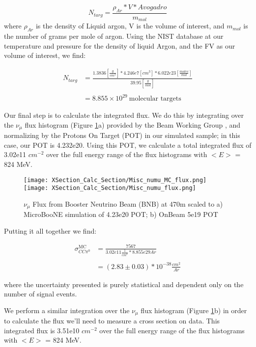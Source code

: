 \begin{equation} \label{eq:1}
  N_{targ} = \frac{\rho_{Ar} * V * Avogadro}{m_{mol}} 
\end{equation}
\noindent where $\rho_{Ar}$ is the density of Liquid argon, V is the volume of interest, and $m_{mol}$ is the number of grams per mole of argon.  Using the NIST database at our temperature and pressure for the density of liquid Argon, and the FV as our volume of interest, we find: 

\begin{align}
N_{targ} &= \frac{1.3836 [\frac{g}{cm^3}] * 4.246e7 [cm^3] * 6.022e23 [\frac{molec}{mol}]}{39.95 [\frac{g}{mol}]} \\\\
&= 8.855\times10^{29}~\text{molecular targets}
\end{align}

\par Our final step is to calculate the integrated flux.  We do this by integrating over the $\nu_\mu$ flux histogram (Figure \ref{fig:flux}a) provided by the Beam Working Group \cite{bib:flux}, and normalizing by the Protons On Target (POT) in our simulated sample; in this case, our POT is 4.232e20.  Using this POT, we calculate a total integrated flux of 3.02e11 $cm^{-2}$ over the full energy range of the flux histograms with $<E>$ = 824 MeV. 
\begin{figure}[H]
\centering
\texttt{[image: XSection\_Calc\_Section/Misc\_numu\_MC\_flux.png]}
\texttt{[image: XSection\_Calc\_Section/Misc\_numu\_flux.png]}

\caption{$\nu_\mu$ Flux from Booster Neutrino Beam (BNB) at 470m scaled to a) MicroBooNE simulation of 4.23e20 POT; b) OnBeam 5e19 POT}
\label{fig:flux}
\end{figure}

\noindent Putting it all together we find:


\begin{align}
\sigma^{\text{MC}}_{CC\pi^0} &= \frac{7567}{3.02e11 \frac{1}{cm^2} * 8.855e29 Ar } \\\\
&= (2.83 \pm 0.03) *10^{-38} \frac{cm^2}{Ar}
\end{align}


\noindent where the uncertainty presented is purely statistical and dependent only on the number of signal events.  

\par We perform a similar integration over the $\nu_\mu$ flux histogram (Figure \ref{fig:flux}b) in order to calculate the flux we'll need to measure a cross section on data. This integrated flux is 3.51e10 $cm^{-2}$ over the full energy range of the flux histograms with $<E>$ = 824 MeV. 

